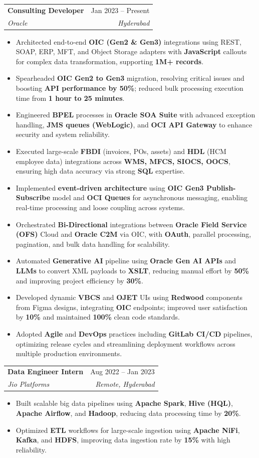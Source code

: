 \documentclass[letterpaper,11pt]{article}
\makeatletter
\newcommand{\resumeItem}[1]{
  \item\small{
    {#1 \vspace{-2pt}}
  }
}
\newcommand{\resumeSubheading}[4]{
  \vspace{-2pt}\item
    \begin{tabular*}{0.97\textwidth}[t]{l@{\extracolsep{\fill}}r}
      \textbf{#1} & #2 \\
      \textit{\small#3} & \textit{\small #4} \\
    \end{tabular*}\vspace{-7pt}
}
\newcommand{\resumeItemListStart}{\begin{itemize}}
\newcommand{\resumeItemListEnd}{\end{itemize}\vspace{-5pt}}
\makeatother
\begin{document}
    \resumeSubheading
      {Consulting Developer}{Jan 2023 -- Present}
      {Oracle}{Hyderabad}
      \resumeItemListStart
        \resumeItem{Architected end-to-end \textbf{OIC (Gen2 \& Gen3)} integrations using REST, SOAP, ERP, MFT, and Object Storage adapters with \textbf{JavaScript} callouts for complex data transformation, supporting \textbf{1M+ records}.}
        \resumeItem{Spearheaded \textbf{OIC Gen2 to Gen3} migration, resolving critical issues and boosting \textbf{API performance by 50\%}; reduced bulk processing execution time from \textbf{1 hour to 25 minutes}.}
        \resumeItem{Engineered \textbf{BPEL} processes in \textbf{Oracle SOA Suite} with advanced exception handling, \textbf{JMS queues (WebLogic)}, and \textbf{OCI API Gateway} to enhance security and system reliability.}
        \resumeItem{Executed large-scale \textbf{FBDI} (invoices, POs, assets) and \textbf{HDL} (HCM employee data) integrations across \textbf{WMS, MFCS, SIOCS, OOCS}, ensuring high data accuracy via strong \textbf{SQL} expertise.}
        \resumeItem{Implemented \textbf{event-driven architecture} using \textbf{OIC Gen3 Publish-Subscribe} model and \textbf{OCI Queues} for asynchronous messaging, enabling real-time processing and loose coupling across systems.}
        \resumeItem{Orchestrated \textbf{Bi-Directional} integrations between \textbf{Oracle Field Service (OFS)} Cloud and \textbf{Oracle C2M} via OIC, with \textbf{OAuth}, parallel processing, pagination, and bulk data handling for scalability.}
        \resumeItem{Automated \textbf{Generative AI} pipeline using \textbf{Oracle Gen AI APIs} and \textbf{LLMs} to convert XML payloads to \textbf{XSLT}, reducing manual effort by \textbf{50\%} and improving project efficiency by \textbf{30\%}.}
        \resumeItem{Developed dynamic \textbf{VBCS} and \textbf{OJET} UIs using \textbf{Redwood} components from Figma designs, integrating \textbf{OIC} endpoints; improved user satisfaction by \textbf{10\%} and maintained \textbf{100\%} clean code standards.}
        \resumeItem{Adopted \textbf{Agile} and \textbf{DevOps} practices including \textbf{GitLab CI/CD} pipelines, optimizing release cycles and streamlining deployment workflows across multiple production environments.}
      \resumeItemListEnd

    \resumeSubheading
      {Data Engineer Intern}{Aug 2022 -- Jan 2023}
      {Jio Platforms}{Remote, Hyderabad}
      \resumeItemListStart
        \resumeItem{Built scalable big data pipelines using \textbf{Apache Spark}, \textbf{Hive (HQL)}, \textbf{Apache Airflow}, and \textbf{Hadoop}, reducing data processing time by \textbf{20\%}.}
        \resumeItem{Optimized \textbf{ETL} workflows for large-scale ingestion using \textbf{Apache NiFi}, \textbf{Kafka}, and \textbf{HDFS}, improving data ingestion rate by \textbf{15\%} with high reliability.}
      \resumeItemListEnd
\end{document}
